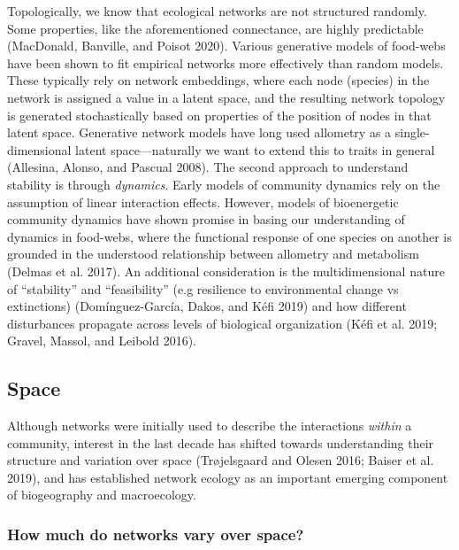 \documentclass[10pt,oneside]{article}
\begin{document}
Topologically, we know that ecological networks are not structured
randomly. Some properties, like the aforementioned connectance, are
highly predictable (MacDonald, Banville, and Poisot 2020). Various
generative models of food-webs have been shown to fit empirical networks
more effectively than random models. These typically rely on network
embeddings, where each node (species) in the network is assigned a value
in a latent space, and the resulting network topology is generated
stochastically based on properties of the position of nodes in that
latent space. Generative network models have long used allometry as a
single-dimensional latent space---naturally we want to extend this to
traits in general (Allesina, Alonso, and Pascual 2008). The second
approach to understand stability is through \emph{dynamics}. Early
models of community dynamics rely on the assumption of linear
interaction effects. However, models of bioenergetic community dynamics
have shown promise in basing our understanding of dynamics in food-webs,
where the functional response of one species on another is grounded in
the understood relationship between allometry and metabolism (Delmas et
al. 2017). An additional consideration is the multidimensional nature of
``stability'' and ``feasibility'' (e.g resilience to environmental
change vs extinctions) (Domínguez-García, Dakos, and Kéfi 2019) and how
different disturbances propagate across levels of biological
organization (Kéfi et al. 2019; Gravel, Massol, and Leibold 2016).

\hypertarget{space}{%
\subsection{Space}\label{space}}

Although networks were initially used to describe the interactions
\emph{within} a community, interest in the last decade has shifted
towards understanding their structure and variation over space
(Trøjelsgaard and Olesen 2016; Baiser et al. 2019), and has established
network ecology as an important emerging component of biogeography and
macroecology.

\hypertarget{how-much-do-networks-vary-over-space}{%
\subsubsection{How much do networks vary over
space?}\label{how-much-do-networks-vary-over-space}}
\end{document}
